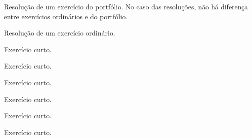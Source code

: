 \documentclass[a4paper]{article}
\begin{document}
\begin{resolucoes}
  \begin{exercicio*}
    Resolução de um exercício do portfólio.
    No caso das resoluções, não há diferença entre exercícios ordinários e do portfólio.
  \end{exercicio*}
  
  \begin{exercicio}
    Resolução de um exercício ordinário.
  \end{exercicio}
  
  \begin{exercicio}
    \lipsum[1-20]
  \end{exercicio}
  
 \begin{exercicio}
    Exercício curto.
  \end{exercicio}

  \begin{exercicio}
    Exercício curto.
  \end{exercicio}

  \begin{exercicio}
    Exercício curto.
  \end{exercicio}

  \begin{exercicio}
    Exercício curto.
  \end{exercicio}

  \begin{exercicio}
    Exercício curto.
  \end{exercicio}

  \begin{exercicio}
    Exercício curto.
  \end{exercicio}

\end{resolucoes}
\end{document}
